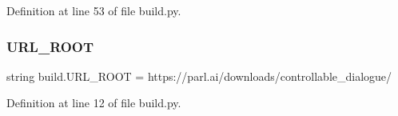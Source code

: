 Definition at line 53 of file build.\+py.

\mbox{\label{namespacebuild_a9fd2022839d1cec94215f5d2b5c78895}} 
\subsubsection{\texorpdfstring{U\+R\+L\+\_\+\+R\+O\+OT}{URL\_ROOT}}
{\footnotesize\ttfamily string build.\+U\+R\+L\+\_\+\+R\+O\+OT = \textquotesingle{}https\+://parl.\+ai/downloads/controllable\+\_\+dialogue/\textquotesingle{}}



Definition at line 12 of file build.\+py.


